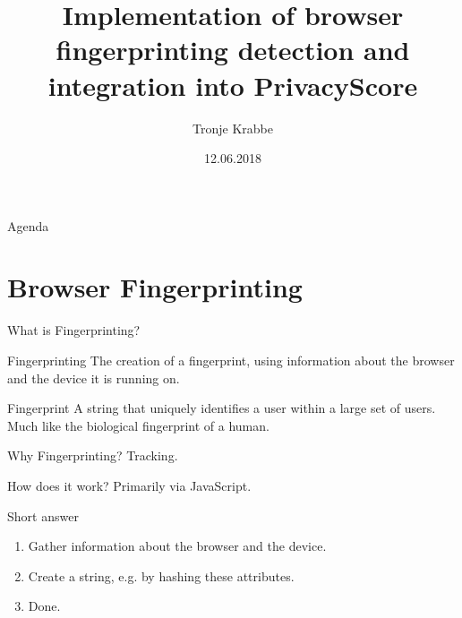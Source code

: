 \documentclass[t]{beamer}
\title[Fingerprinting Detection]{Implementation of browser fingerprinting detection and integration into PrivacyScore}
\author[Krabbe]{Tronje Krabbe}
\institute[Uni Hamburg]{Universität Hamburg\\ Fachbereich Informatik}
\date{12.06.2018}
\begin{document}
\begin{frame}[plain]
	\maketitle
\end{frame}


\begin{frame}{Agenda}
	\tableofcontents
\end{frame}

\section{Browser Fingerprinting}
\begin{frame}{What is Fingerprinting?}
    \begin{block}{Fingerprinting}
        The creation of a fingerprint, using information about the browser and the
        device it is running on.
    \end{block}

    \pause

    \begin{block}{Fingerprint}
        A string that uniquely identifies a user within a large set of users.
        \pause
        Much like the biological fingerprint of a human.
    \end{block}
\end{frame}

\begin{frame}{Why Fingerprinting?}
    \pause
    \vspace{3cm}
    \centering \LARGE Tracking.
\end{frame}

\begin{frame}{How does it work?}
    Primarily via JavaScript.

    \pause

    \begin{block}{Short answer}
        \begin{enumerate}
            \pause
            \item Gather information about the browser and the device.
            \pause
            \item Create a string, e.g. by hashing these attributes.
            \pause
            \item Done.
        \end{enumerate}
    \end{block}
\end{frame}
\end{document}
